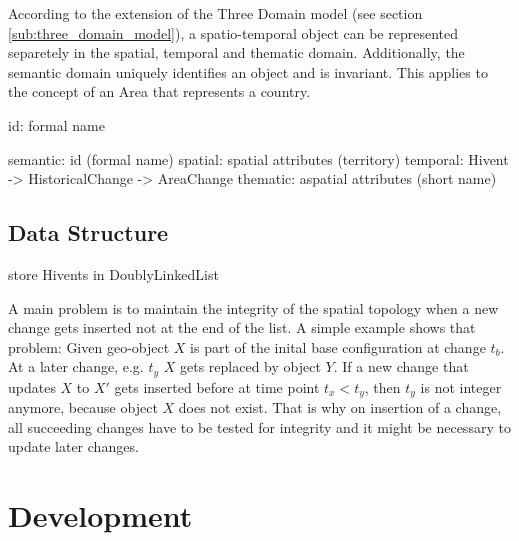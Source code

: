 According to the extension of the Three Domain model (see section \ref{sub:three_domain_model}), a spatio-temporal object can be represented separetely in the spatial, temporal and thematic domain. Additionally, the semantic domain uniquely identifies an object and is invariant. This applies to the concept of an Area that represents a country.


id: formal name

semantic: id (formal name)
spatial:  spatial attributes (territory)
temporal: Hivent -> HistoricalChange -> AreaChange
thematic: aspatial attributes (short name)


\subsection{Data Structure} %
\label{sub:data_structure}

store Hivents in DoublyLinkedList



A main problem is to maintain the integrity of the spatial topology when a new change gets inserted not at the end of the list. A simple example shows that problem: Given geo-object $X$ is part of the inital base configuration at change $t_b$. At a later change, e.g. $t_y$ $X$ gets replaced by object $Y$. If a new change that updates $X$ to $X'$ gets inserted before at time point $t_x < t_y$, then $t_y$ is not integer anymore, because object $X$ does not exist. That is why on insertion of a change, all succeeding changes have to be tested for integrity and it might be necessary to update later changes.



\label{sec:development}

\section{Development} %

